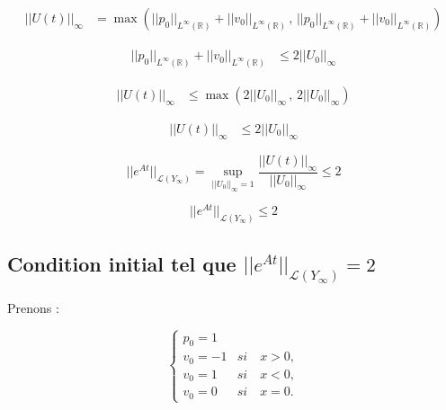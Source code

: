 \documentclass[a4paper,11pt]{article}
\begin{document}
\begin{displaymath}
    \begin{split}
        ||U(t)||_{\infty} &= \max \left( ||p_0||_{L^{\infty}(\mathbb{R})} + ||v_0||_{L^{\infty}(\mathbb{R})} \, , \,
        ||p_0||_{L^{\infty}(\mathbb{R})} + ||v_0||_{L^{\infty}(\mathbb{R})} \right)
    \end{split}
\end{displaymath}


\begin{displaymath}
    \begin{split}
        ||p_0||_{L^{\infty}(\mathbb{R})} + ||v_0||_{L^{\infty}(\mathbb{R})} & \le 2 ||U_{0}||_{\infty} 
    \end{split}
\end{displaymath}

\begin{displaymath}
    \begin{split}
        ||U(t)||_{\infty} & \le \max \left( 2 ||U_{0}||_{\infty}  \, , \,
        2 ||U_{0}||_{\infty}  \right)
    \end{split}
\end{displaymath}


\begin{displaymath}
    \begin{split}
        ||U(t)||_{\infty} & \le 2 ||U_0||_{\infty}
    \end{split}
\end{displaymath}

\begin{equation*}
||e^{At}||_{\mathcal{L}(Y_{\infty})} = \sup_{||U_{0}||_{\infty} = 1}\frac{||U(t)||_{\infty}}{||U_{0}||_{\infty}}  \le 2
\end{equation*}

\begin{equation*}
    ||e^{At}||_{\mathcal{L}(Y_{\infty})} \le 2
\end{equation*}

\subsection*{Condition initial tel que \( ||e^{At}||_{\mathcal{L}(Y_{\infty})} = 2\) }

Prenons :

\begin{equation*}
    \begin{cases}
        p_{0} = 1 \\
        v_{0} = -1 & si \quad x > 0, \\
        v_{0} = 1 & si \quad  x < 0, \\
        v_{0} = 0 & si \quad  x = 0.
    \end{cases}
\end{equation*}
\end{document}
